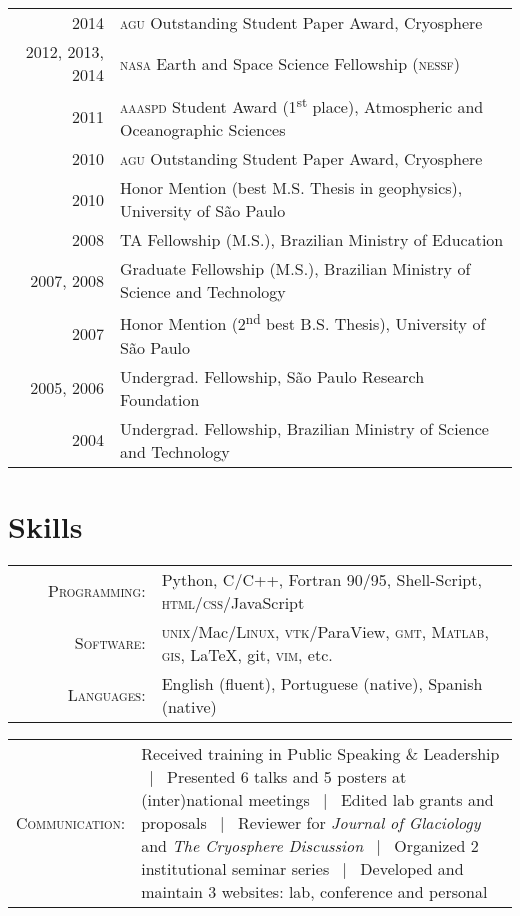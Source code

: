 \documentclass[a4paper,11pt]{article}
\begin{document}
\begin{tabular}{rl}
2014 & \textsc{agu} Outstanding Student Paper Award, Cryosphere\\
2012, 2013, 2014 & \textsc{nasa} Earth and Space Science Fellowship (\textsc{nessf})\\ 
2011 & \textsc{aaaspd} Student Award (1\textsuperscript{st} place), Atmospheric and Oceanographic Sciences\\
2010 & \textsc{agu} Outstanding Student Paper Award, Cryosphere\\
2010 & Honor Mention (best M.S. Thesis in geophysics), University of S\~ao Paulo\\
2008 & TA Fellowship (M.S.), Brazilian Ministry of Education\\
2007, 2008 & Graduate Fellowship (M.S.), Brazilian Ministry of Science and Technology\\
2007 & Honor Mention (2\textsuperscript{nd} best B.S. Thesis), University of S\~ao Paulo\\
2005, 2006 & Undergrad. Fellowship, S\~ao Paulo Research Foundation\\
2004 & Undergrad. Fellowship, Brazilian Ministry of Science and Technology
\end{tabular}


\section{Skills}

\begin{tabular}{rl}
\textsc{~~~~Programming:} & Python, C/C++, Fortran 90/95, Shell-Script, \textsc{html}/\textsc{css}/JavaScript\\
\textsc{Software:} & \textsc{unix}/Mac/\textsc{Linux}, \textsc{vtk}/ParaView, \textsc{gmt}, \textsc{Matlab}, \textsc{gis}, \LaTeX, git, \textsc{vim}, etc.\\
\textsc{Languages:} & English (fluent), Portuguese (native), Spanish (native)
\end{tabular}

\begin{tabular}{rp{12.4cm}}
\textsc{Communication:} & {\small Received training in Public Speaking \& Leadership ~|~ Presented 6 talks and 5 posters at (inter)national meetings ~|~ Edited lab grants and proposals ~|~ Reviewer for {\it Journal of Glaciology} and {\it The Cryosphere Discussion} ~|~ Organized 2 institutional seminar series ~|~ Developed and maintain 3 websites: lab, conference and personal}
\end{tabular}
\end{document}
